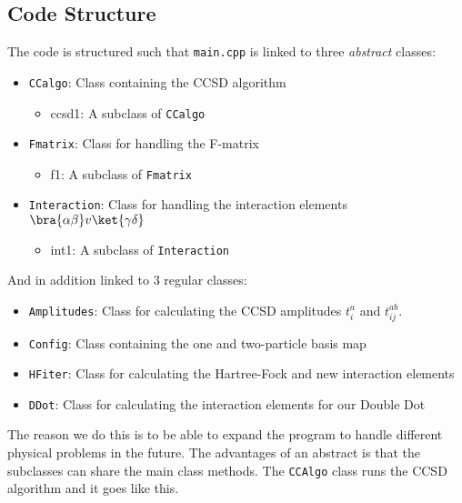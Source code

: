 \subsection{Code Structure}
The code is structured such that \texttt{main.cpp} is linked to three \emph{abstract} classes:
\begin{itemize}
  \item \texttt{CCalgo}: Class containing the CCSD algorithm
  \begin{itemize}
  \item ccsd1: A subclass of \texttt{CCalgo} 
  \end{itemize}
  \item \texttt{Fmatrix}: Class for handling the F-matrix
    \begin{itemize}
  \item f1: A subclass of \texttt{Fmatrix} 
  \end{itemize}
  \item \texttt{Interaction}: Class for handling the interaction elements $\bra{\alpha \beta}v\ket{\gamma \delta}$
      \begin{itemize}
  \item int1: A subclass of \texttt{Interaction} 
  \end{itemize}
\end{itemize}
And in addition linked to 3 regular classes:
\begin{itemize}
  \item \texttt{Amplitudes}: Class for calculating the CCSD amplitudes $t_i^a$ and $t_{ij}^{ab}$. 
  \item \texttt{Config}: Class containing the one and two-particle basis map
  \item \texttt{HFiter}: Class for calculating the Hartree-Fock and new interaction elements 
  \item \texttt{DDot}: Class for calculating the interaction elements for our Double Dot
\end{itemize}
%
The reason we do this is to be able to expand the program to handle different physical problems in the future. The advantages of an abstract is that the subclasses can share the main class methods. The \texttt{CCAlgo} class runs the CCSD algorithm and it goes like this.
